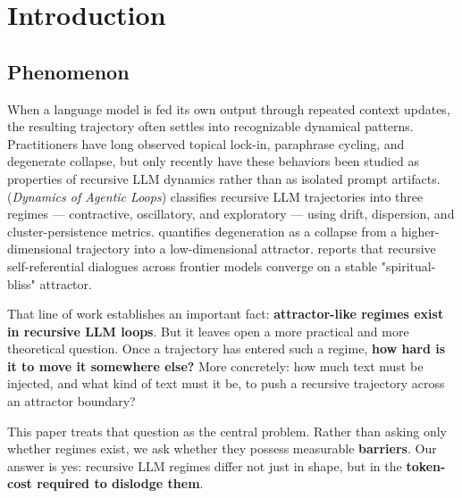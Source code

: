 \documentclass{article}
\theoremstyle{plain}
\theoremstyle{definition}
\begin{document}
\begin{abstract}
The full pipeline regenerates from raw trajectories
(\texttt{steps.jsonl}, LFS-tracked) using a documented \texttt{embed → analyze →
report} chain. All code, configs, raw data, and reports are publicly
available (https://github.com/kaplan196883/llmattr); 103/103 numeric
claims are cell-verified against the published CSVs (\texttt{RESULTS.md}).

---
\end{abstract}



\section{Introduction}

\subsection{Phenomenon}

When a language model is fed its own output through repeated context
updates, the resulting trajectory often settles into recognizable
dynamical patterns. Practitioners have long observed topical lock-in,
paraphrase cycling, and degenerate collapse, but only recently have
these behaviors been studied as properties of recursive LLM dynamics
rather than as isolated prompt artifacts. \citet{arxiv251210350}
(\textit{Dynamics of Agentic Loops}) classifies recursive LLM trajectories
into three regimes — contractive, oscillatory, and exploratory —
using drift, dispersion, and cluster-persistence metrics.
\citet{arxiv251021258} quantifies degeneration as a collapse from a
higher-dimensional trajectory into a low-dimensional attractor.
\citet{arxiv251024797} reports that recursive self-referential dialogues
across frontier models converge on a stable "spiritual-bliss"
attractor.

That line of work establishes an important fact: \textbf{attractor-like
regimes exist in recursive LLM loops}. But it leaves open a more
practical and more theoretical question. Once a trajectory has
entered such a regime, \textbf{how hard is it to move it somewhere else?}
More concretely: how much text must be injected, and what kind of
text must it be, to push a recursive trajectory across an attractor
boundary?

This paper treats that question as the central problem. Rather than
asking only whether regimes exist, we ask whether they possess
measurable \textbf{barriers}. Our answer is yes: recursive LLM regimes
differ not just in shape, but in the \textbf{token-cost required to
dislodge them}.
\end{document}
